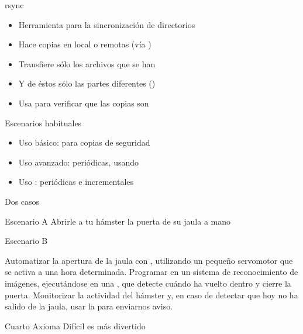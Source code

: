 \documentclass[14pt]{beamer}
\begin{document}
\begin{frame}{rsync}

  \begin{itemize} \itemsep0em
    \item Herramienta  para la sincronización
      de directorios
    \item Hace copias en local o remotas (vía )
    \item Transfiere sólo los archivos que se han 
    \item Y de éstos sólo las partes diferentes
      ()
    \item Usa  para verificar que las copias son
  \end{itemize}

  \begin{alertblock}{\centering \footnotesize Escenarios habituales}
    \begin{itemize} \itemsep0em
      \footnotesize
      \item Uso básico: para copias de seguridad
      \item Uso avanzado: periódicas, usando 
      \item Uso : periódicas e incrementales
    \end{itemize}
  \end{alertblock}

\end{frame}

\begin{frame}{Dos casos}

  \begin{exampleblock}{Escenario A}\centering
   \small Abrirle a tu hámster la puerta de su jaula a mano
   \end{exampleblock}

  \begin{block}{Escenario B} \centering

    \small Automatizar la apertura de la jaula con
    , utilizando un pequeño servomotor que se
    activa a una hora determinada. Programar en  un
    sistema de reconocimiento de imágenes, ejecutándose en una
    , que detecte cuándo ha vuelto dentro y
    cierre la puerta. Monitorizar la actividad del hámster y, en caso
    de detectar que hoy no ha salido de la jaula, usar la
     para enviarnos aviso.
   \end{block}

  \begin{alertblock}{\centering Cuarto Axioma}
    \centering Difícil es más divertido
  \end{alertblock}

\end{frame}
\end{document}
